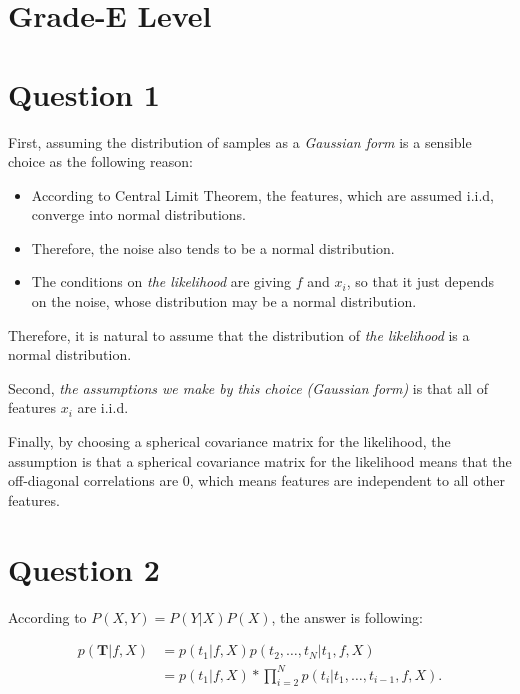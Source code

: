 \documentclass[12pt,letterpaper]{article}
\begin{document}
\section*{Grade-E Level}


\section*{Question 1}
First, assuming the distribution of samples as a \textit{Gaussian form}
is a sensible choice as the following reason:

\begin{itemize}
  \item 
  According to Central Limit Theorem, the features, which are assumed i.i.d,
  converge into normal distributions.
  \item
  Therefore, the noise also tends to be a normal distribution. 
  \item
  The conditions on \textit{the likelihood} are giving $f$ and $x_i$,
  so that it just depends on the noise, whose distribution may be a normal distribution.
\end{itemize}

Therefore, it is natural to assume that
the distribution of \textit{the likelihood} is a normal distribution.

Second, 
\textit{the assumptions we make by this choice (Gaussian form)}
is that all of features $x_i$ are i.i.d.

Finally, by choosing a spherical covariance matrix for the likelihood,
the assumption is that
a spherical covariance matrix for the likelihood means that the off-diagonal correlations are $0$,
which means features are independent to all other features.

\section*{Question 2}

According to $P(X, Y) = P(Y | X)P(X)$,
the answer is following:

\begin{equation}
\begin{split}
p \left({\textbf{T}| f, X} \right)& = p(t_1|f, X)p(t_2, \ldots, t_N | t_1, f, X) \\
& = p \left ({t_1 | f, X} \right)
*\prod_{i=2}^{N} p\left ({t_i | t_1, \ldots, t_{i-1}, f, X} \right).
\end{split}
\end{equation}
\end{document}
